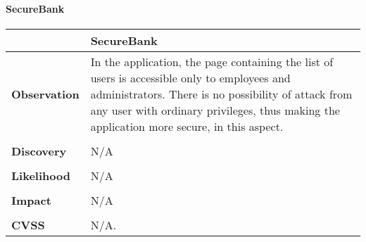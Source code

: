 \paragraph{SecureBank} \mbox{}
\begin{longtable*}{p{.20\textwidth} | p{.80\textwidth}}
    \hline
    & \textbf{SecureBank} \\
    \hline
    \textbf{Observation} &
       In the application, the page containing the list of users is accessible only to employees and administrators. There is no possibility of attack from any user with ordinary privileges, thus making the application more secure, in this aspect. 
    \\\\
    \textbf{Discovery} &
   		N/A
    \\\\
    \textbf{Likelihood} &
	   N/A
    \\\\
    \textbf{Impact} &
  		N/A
    \\\\
    \textbf{CVSS} &
       N/A.
    \\
    \hline
\end{longtable*}
\clearpage